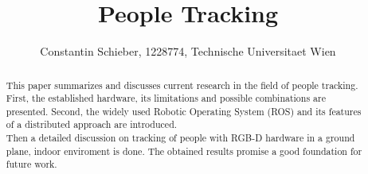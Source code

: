 \documentclass[a4paper,oneside,10pt,DIV12,headsepline,footexclude,headexclude]{scrartcl}
\newif\ifpdf
\let\ifpdf\relax
\begin{document}
\ifpdf
\else
\fi


\pagestyle{plain} %

\title{\Large People Tracking}

\author{\large Constantin Schieber, 1228774, Technische Universitaet Wien}

\maketitle

\begin{abstract}
This paper summarizes and discusses current research in the field of 
people tracking.
First, the established hardware, its limitations and
possible combinations are presented. Second, the widely used Robotic
Operating System (ROS) and its features of a distributed approach are introduced.\\
Then a detailed discussion on tracking of people with RGB-D hardware in a ground
plane, indoor enviroment is done.
The obtained results promise a good foundation for future work.

\end{abstract}
\end{document}
